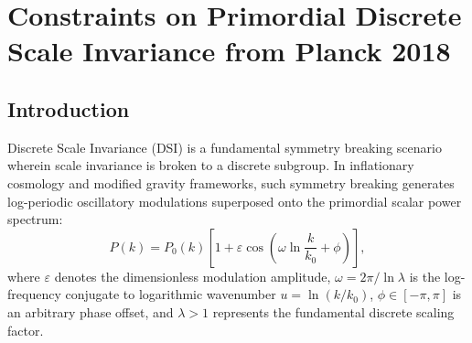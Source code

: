 \chapter{Constraints on Primordial Discrete Scale Invariance from Planck 2018}
\label{ch:planck_dsi}

\begin{abstract}
We present a pre-registered, radix-agnostic search for discrete scale invariance (DSI) in the Planck 2018 cosmic microwave background temperature power spectrum. DSI predicts a characteristic log-periodic modulation of primordial perturbations governed by the preferred scaling factor $\lambda$, inducing oscillations in Fourier space with angular log-frequency $\omega = 2\pi/\ln\lambda$. Using a certified three-stage protocol (detection via generalized Lomb-Scargle periodogram, non-linear refinement, and multiplicity-corrected certification) subject to five mandatory integrity gates applied to residuals relative to the official Planck \texttt{BestFit} $\Lambda$CDM spectrum ($N = 83$ binned multipoles), we find \textbf{no evidence for DSI} in the Planck 2018 data. The most prominent residual candidate ($\hat\lambda = 1.2938 \pm 0.0072$) yields an empirical post-trial significance of $p_{\mathrm{corrected}} = 0.998$ via a non-parametric bootstrap-of-maximum null distribution and $\Delta\mathrm{BIC} = -49.80$, with an amplitude fully consistent with Gaussian cosmological sample variance. We establish rigorous 95\% confidence level upper limits on the modulation amplitude $\varepsilon < 0.05$ across the comprehensive scaling range $\lambda \in [1.1, 148]$. Furthermore, we replicate our protocol on synthetic Large-Scale Structure mocks matching the Dark Energy Spectroscopic Instrument (DESI) survey precision, confirming identical null-detection behavior ($p_{\mathrm{corrected}} = 0.314$, $\Delta\mathrm{BIC} = +8.80$).
\end{abstract}

\section{Introduction}
Discrete Scale Invariance (DSI) is a fundamental symmetry breaking scenario wherein scale invariance is broken to a discrete subgroup. In inflationary cosmology and modified gravity frameworks, such symmetry breaking generates log-periodic oscillatory modulations superposed onto the primordial scalar power spectrum:
\begin{equation}
P(k) = P_0(k) \left[ 1 + \varepsilon \cos\left( \omega \ln\frac{k}{k_0} + \phi \right) \right],
\end{equation}
where $\varepsilon$ denotes the dimensionless modulation amplitude, $\omega = 2\pi/\ln\lambda$ is the log-frequency conjugate to logarithmic wavenumber $u = \ln(k/k_0)$, $\phi \in [-\pi, \pi]$ is an arbitrary phase offset, and $\lambda > 1$ represents the fundamental discrete scaling factor.

